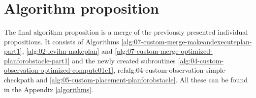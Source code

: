 \section{Algorithm proposition}\label{merged_proposition_section}

\paragraph{} The final algorithm proposition is a merge of the previously presented individual propositions. It consists of Algorithms \ref{alg:07-custom-merge-makeandexecuteplan-part1}, \ref{alg:02-levihn-makeplan} and \ref{alg:07-custom-merge-optimized-planforobstacle-part1} and the newly created subroutines \ref{alg:04-custom-observation-optimized-compute01c1}, ref{alg:04-custom-observation-simple-checkpath} and \ref{alg:05-custom-placement-planforobstacle}. All these can be found in the Appendix \ref{algorithms}.
